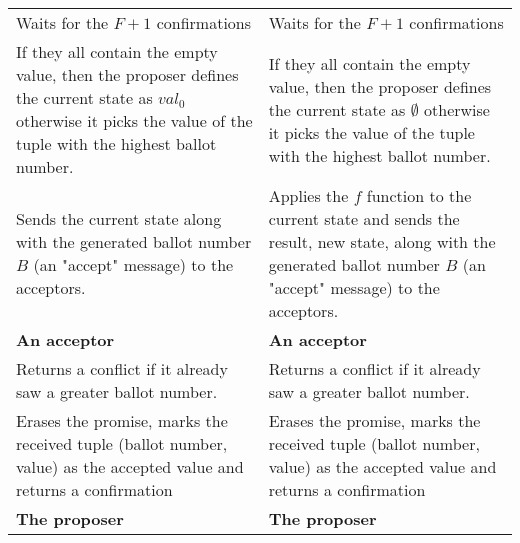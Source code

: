 \documentclass[a4paper,USenglish]{lipics-v2018}
\theoremstyle{definition}
\begin{document}
\begin{center}
\begin{longtable}{p{15em}|p{15em}}
            
            Waits for the $F+1$ confirmations
            &
            Waits for the $F+1$ confirmations \\[6pt]
            
            
            If they all contain the empty value, then the proposer defines the current state as   $val_0$ otherwise it picks the value of the tuple with the highest ballot number.
            &
            If they all contain the empty value, then the proposer defines the current state as   $\emptyset$ otherwise it picks the value of the tuple with the highest ballot number.
            \\[6pt]
            
            
            Sends the current state along with the generated ballot number $B$ (an "accept"   message) to the acceptors.
            &
            Applies the $f$ function to the current state and sends the result, new state, along   with the generated ballot number $B$ (an "accept" message) to the acceptors.
            \\[6pt]
            
            \hline
            
            {\bf An acceptor}
            &
            {\bf An acceptor} \\[6pt]
            
            
            Returns a conflict if it already saw a greater ballot number.
            &
            Returns a conflict if it already saw a greater ballot number.
            \\[6pt]
            
            
            Erases the promise, marks the received tuple (ballot number, value) as the accepted   value and returns a confirmation
            &
            Erases the promise, marks the received tuple (ballot number, value) as the accepted   value and returns a confirmation
            \\[6pt]
            
            \hline
            
            {\bf The proposer}
            &
            {\bf The proposer} \\[6pt]
            

\end{longtable}
\end{center}
\end{document}
